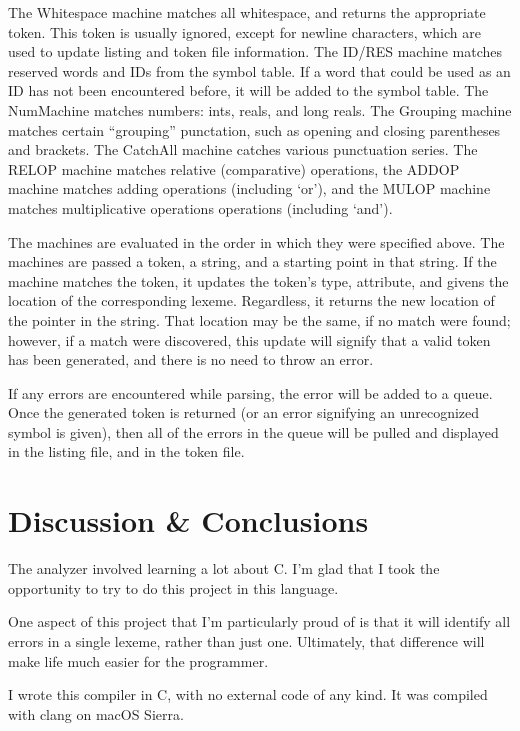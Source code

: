 \documentclass[titlepage]{article}
\begin{document}
    The Whitespace machine matches all whitespace, and returns the appropriate
    token. This token is usually ignored, except for newline characters, which
    are used to update listing and token file information. The ID/RES machine
    matches reserved words and IDs from the symbol table. If a word that could
    be used as an ID has not been encountered before, it will be added to the
    symbol table. The NumMachine matches numbers: ints, reals, and long reals.
    The Grouping machine matches certain ``grouping'' punctation, such as opening
    and closing parentheses and brackets. The CatchAll machine catches various
    punctuation series. The RELOP machine matches relative (comparative)
    operations, the ADDOP machine matches adding operations (including `or'),
    and the MULOP machine matches multiplicative operations operations
    (including `and').

    The machines are evaluated in the order in which they were specified above.
    The machines are passed a token, a string, and a starting point in that
    string. If the machine matches the token, it updates the token's type,
    attribute, and givens the location of the corresponding lexeme. Regardless,
    it returns the new location of the pointer in the string. That location
    may be the same, if no match were found; however, if a match were discovered,
    this update will signify that a valid token has been generated, and
    there is no need to throw an error.

    If any errors are encountered while parsing, the error will be added
    to a queue. Once the generated token is returned (or an error signifying an
    unrecognized symbol is given), then all of the errors in the queue will
    be pulled and displayed in the listing file, and in the token file.

    \section{Discussion \& Conclusions}
    The analyzer involved learning a lot about C. I'm glad that I took the
    opportunity to try to do this project in this language.

    One aspect of this project that I'm particularly proud of is that it will
    identify all errors in a single lexeme, rather than just one. Ultimately,
    that difference will make life much easier for the programmer.

    I wrote this compiler in C, with no external code of any kind. It was
    compiled with clang on macOS Sierra.
\end{document}
